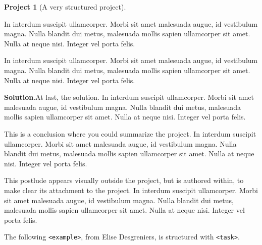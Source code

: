 \documentclass{amsart}
\theoremstyle{plain}%
\theoremstyle{definition}%
\newtheorem{project}[theorem]{Project}
\theoremstyle{remark}%
\newcommand{\blocktitlefont}{\relax}
\newcommand{\mono}[1]{\texttt{#1}}
\numberwithin{equation}{section}
\begin{document}
\begin{project}[A very structured project]
\begin{enumerate}[font=\bfseries,label=(\alph*),ref=\alph*]
\par
In interdum suscipit ullamcorper. Morbi sit amet malesuada augue, id vestibulum magna. Nulla blandit dui metus, malesuada mollis sapien ullamcorper sit amet. Nulla at neque nisi. Integer vel porta felis.%
\par
In interdum suscipit ullamcorper. Morbi sit amet malesuada augue, id vestibulum magna. Nulla blandit dui metus, malesuada mollis sapien ullamcorper sit amet. Nulla at neque nisi. Integer vel porta felis.%
\par\smallskip%
\noindent\textbf{\blocktitlefont Solution}.\hypertarget{project-structured-7-5}{}\quad{}At last, the solution.  In interdum suscipit ullamcorper. Morbi sit amet malesuada augue, id vestibulum magna. Nulla blandit dui metus, malesuada mollis sapien ullamcorper sit amet. Nulla at neque nisi. Integer vel porta felis.%
\end{enumerate}%
This is a conclusion where you could summarize the project.  In interdum suscipit ullamcorper. Morbi sit amet malesuada augue, id vestibulum magna. Nulla blandit dui metus, malesuada mollis sapien ullamcorper sit amet. Nulla at neque nisi. Integer vel porta felis.%
\end{project}%
\par
This postlude appears visually outside the project, but is authored within, to make clear its attachment to the project.  In interdum suscipit ullamcorper. Morbi sit amet malesuada augue, id vestibulum magna. Nulla blandit dui metus, malesuada mollis sapien ullamcorper sit amet. Nulla at neque nisi. Integer vel porta felis.%
\par
The following \mono{<example>}, from Elise Desgreniers, is structured with \mono{<task>}.%
\end{document}
